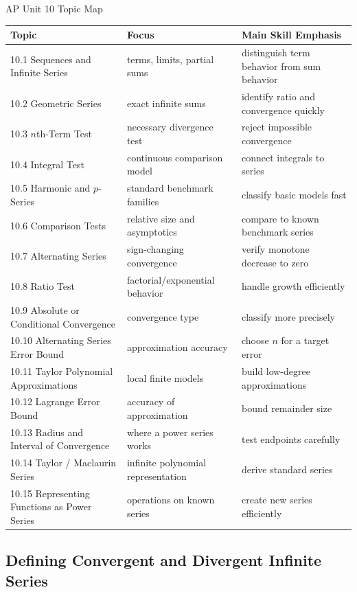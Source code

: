 \documentclass[11pt]{article}
\newcommand{\unitchapter}[1]{%
\newpage
\subsection{#1}
}
\begin{document}
\begin{theorybox}{AP Unit 10 Topic Map}
\renewcommand{\arraystretch}{1.25}
\begin{tabularx}{\textwidth}{@{}p{}p{}X@{}}
\toprule
Topic & Focus & Main Skill Emphasis \\
\midrule
10.1 Sequences and Infinite Series & terms, limits, partial sums & distinguish term behavior from sum behavior \\
10.2 Geometric Series & exact infinite sums & identify ratio and convergence quickly \\
10.3 \(n\)th-Term Test & necessary divergence test & reject impossible convergence \\
10.4 Integral Test & continuous comparison model & connect integrals to series \\
10.5 Harmonic and \(p\)-Series & standard benchmark families & classify basic models fast \\
10.6 Comparison Tests & relative size and asymptotics & compare to known benchmark series \\
10.7 Alternating Series & sign-changing convergence & verify monotone decrease to zero \\
10.8 Ratio Test & factorial/exponential behavior & handle growth efficiently \\
10.9 Absolute or Conditional Convergence & convergence type & classify more precisely \\
10.10 Alternating Series Error Bound & approximation accuracy & choose \(n\) for a target error \\
10.11 Taylor Polynomial Approximations & local finite models & build low-degree approximations \\
10.12 Lagrange Error Bound & accuracy of approximation & bound remainder size \\
10.13 Radius and Interval of Convergence & where a power series works & test endpoints carefully \\
10.14 Taylor / Maclaurin Series & infinite polynomial representation & derive standard series \\
10.15 Representing Functions as Power Series & operations on known series & create new series efficiently \\
\bottomrule
\end{tabularx}
\end{theorybox}

\unitchapter{Defining Convergent and Divergent Infinite Series}
\end{document}

